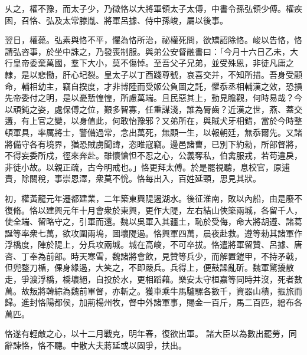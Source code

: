 \begin{pinyinscope}
 
乆之，權不豫，而太子少，乃徵恪以大將軍領太子太傅，中書令孫弘領少傅。權疾困，召恪、弘及太常滕胤、將軍呂據、侍中孫峻，屬以後事。
 
 
 
 
 翌日，權薨。弘素與恪不平，懼為恪所治，祕權死問，欲矯詔除恪。峻以告恪，恪請弘咨事，於坐中誅之，乃發喪制服。與弟公安督融書曰：「今月十六日乙未，大行皇帝委棄萬國，羣下大小，莫不傷悼。至吾父子兄弟，並受殊恩，非徒凡庸之隷，是以悲慟，肝心圮裂。皇太子以丁酉踐尊號，哀喜交并，不知所措。吾身受顧命，輔相幼主，竊自揆度，才非博陸而受姬公負圖之託，懼忝丞相輔漢之效，恐損先帝委付之明，是以憂慙惶惶，所慮萬端。且民惡其上，動見瞻觀，何時易哉？今以頑鈍之姿，處保傅之位，艱多智寡，任重謀淺，誰為脣齒？近漢之世，燕、蓋交遘，有上官之變，以身值此，何敢怡豫邪？又弟所在，與賊犬牙相錯，當於今時整頓軍具，率厲將士，警備過常，念出萬死，無顧一生，以報朝廷，無忝爾先。又諸將備守各有境界，猶恐賊虜聞諱，恣睢寇竊。邊邑諸曹，已別下約勑，所部督將，不得妄委所戍，徑來奔赴。雖懷愴怛不忍之心，公義奪私，伯禽服戎，若苟違戾，非徒小故。以親正疏，古今明戒也。」恪更拜太傅。於是罷視聽，息校官，原逋責，除關稅，事崇恩澤，衆莫不恱。恪每出入，百姓延頸，思見其狀。
 
 
 
 
 初，權黃龍元年遷都建業，二年築東興隄遏湖水。後征淮南，敗以內船，由是廢不復脩。恪以建興元年十月會衆於東興，更作大隄，左右結山俠築兩城，各留千人，使全端、留略守之，引軍而還。魏以吳軍入其疆土，恥於受侮，命大將胡遵、諸葛誕等率衆七萬，欲攻圍兩塢，圖壞隄遏。恪興軍四萬，晨夜赴救。遵等勑其諸軍作浮橋度，陣於隄上，分兵攻兩城。城在高峻，不可卒拔。恪遣將軍留贊、呂據、唐咨、丁奉為前部。時天寒雪，魏諸將會飲，見贊等兵少，而解置鎧甲，不持矛戟，但兜鍪刀楯，倮身緣遏，大笑之，不即嚴兵。兵得上，便鼓譟亂斫。魏軍驚擾散走，爭渡浮橋，橋壞絕，自投於水，更相蹈藉。樂安太守桓嘉等同時并沒，死者數萬。故叛將韓綜為魏前軍督，亦斬之。獲車乘牛馬驢騾各數千，資器山積，振旅而歸。進封恪陽都侯，加荊楊州牧，督中外諸軍事，賜金一百斤，馬二百匹，繒布各萬匹。
 
 
恪遂有輕敵之心，以十二月戰克，明年春，復欲出軍。
 諸大臣以為數出罷勞，同辭諫恪，恪不聽。中散大夫蔣延或以固爭，扶出。
 

\end{pinyinscope}
